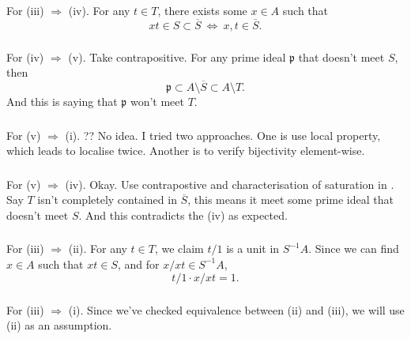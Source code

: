 \subsubsection{}\label{Atiyah Chapter 3 Ex 8. 3-4}

For (iii) $\Rightarrow$ (iv). For any $t\in T$, there exists some $x\in A$ such that 
\[xt\in S\subset \overline{S} ~\Leftrightarrow~ x,t\in\overline{S}.\]

\subsubsection{}

For (iv) $\Rightarrow$ (v). Take contrapositive. For any prime ideal $\mathfrak p$ that doesn't meet $S$, then \[\mathfrak p\subset A\setminus \overline{S}\subset A\setminus T.\] And this is saying that $\mathfrak p$ won't meet $T$.

\subsubsection{}

For (v) $\Rightarrow$ (i). 
?? No idea. I tried two approaches. One is use local property, which leads to localise twice. Another is to verify bijectivity element-wise.

\subsubsection{}

For (v) $\Rightarrow$ (iv). Okay. Use contrapostive and characterisation of saturation in . Say $T$ isn't completely contained in $\overline{S}$, this means it meet some prime ideal that doesn't meet $S$. And this contradicts the (iv) as expected.

\subsubsection{}

For (iii) $\Rightarrow$ (ii). For any $t\in T$, we claim $t/1$ is a unit in $S^{-1}A$. Since we can find $x\in A$ such that $xt\in S$, and for $x/xt\in S^{-1}A$,
\[t/1\cdot x/xt = 1.\]

\subsubsection{}

For (iii) $\Rightarrow$ (i). Since we've checked equivalence between (ii) and (iii), we will use (ii) as an assumption.

